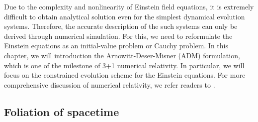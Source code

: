 Due to the complexity and nonlinearity of Einstein field equations, it is extremely difficult to obtain analytical solution even for the simplest dynamical evolution systems.
Therefore, the accurate description of the such systems can only be derived through numerical simulation.
For this, we need to reformulate the Einstein equations as an initial-value problem or Cauchy problem.
In this chapter, we will introduction the Arnowitt-Deser-Misner (ADM) formulation, which is one of the milestone of 3+1 numerical relativity.
In particular, we will focus on the constrained evolution scheme for the Einstein equations.
For more comprehensive discussion of numerical relativity,
we refer readers to \cite{shibata2015numerical,baumgarte2010numerical,gourgoulhon20123+}.

\subsection{Foliation of spacetime} \label{section1.2.1}

